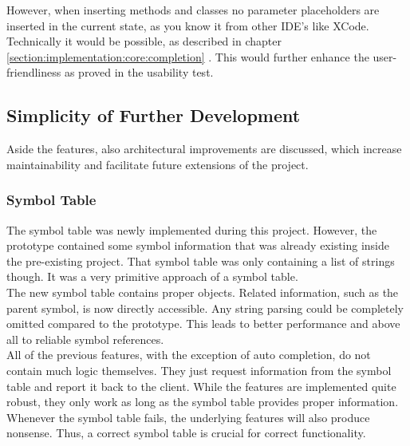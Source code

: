 However, when inserting methods and classes no parameter placeholders are inserted in the current state,
as you know it from other IDE's like XCode.
Technically it would be possible, as described in chapter
\ref{section:implementation:core:completion} .
This would further enhance the user-friendliness as proved in the usability test.

\subsection{Simplicity of Further Development}
Aside the features, also architectural improvements are discussed,
which increase maintainability and facilitate future extensions of the project.

\subsubsection{Symbol Table}
The symbol table was newly implemented during this project.
However, the prototype contained some symbol information that was already existing inside the pre-existing project.
That symbol table was only containing a list of strings though.
It was a very primitive approach of a symbol table.\\

The new symbol table contains proper objects.
Related information, such as the parent symbol, is now directly accessible.
Any string parsing could be completely omitted compared to the prototype.
This leads to better performance and above all to reliable symbol references.\\

All of the previous features, with the exception of auto completion, do not contain much logic themselves.
They just request information from the symbol table and report it back to the client.
While the features are implemented quite robust, they only work as long as the symbol table provides proper information.\\

Whenever the symbol table fails, the underlying features will also produce nonsense.
Thus, a correct symbol table is crucial for correct functionality.\\

